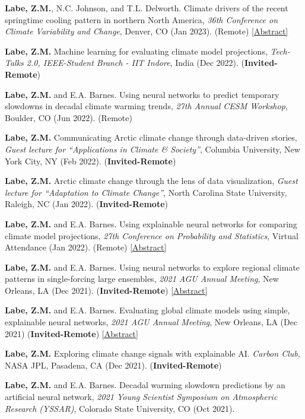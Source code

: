 \documentclass[margin,line,palatino,courier,10pt]{res}
\begin{document}
\begin{resume}
\begin{etaremune}[leftmargin=0in,topsep=0in,parsep=0in]
\item \textbf{Labe, Z.M.}, N.C. Johnson, and T.L. Delworth. Climate drivers of the recent springtime cooling pattern in northern North America, \textit{36th Conference on Climate Variability and Change}, Denver, CO (Jan 2023). (Remote) \href{https://ams.confex.com/ams/103ANNUAL/meetingapp.cgi/Paper/415409}{[Abstract]}
\item \textbf{Labe, Z.M.} Machine learning for evaluating climate model projections, \textit{Tech-Talks 2.0, IEEE-Student Branch - IIT Indore}, India (Dec 2022). (\textbf{Invited-Remote})
\item \textbf{Labe, Z.M.} and E.A. Barnes. Using neural networks to predict temporary slowdowns in decadal climate warming trends, \textit{27th Annual CESM Workshop}, Boulder, CO (Jun 2022). (Remote)
\item \textbf{Labe, Z.M.} Communicating Arctic climate change through data-driven stories, \textit{Guest lecture for ``Applications in Climate \& Society''}, Columbia University, New York City, NY (Feb 2022). (\textbf{Invited-Remote}) 
\item \textbf{Labe, Z.M.} Arctic climate change through the lens of data visualization, \textit{Guest lecture for ``Adaptation to Climate Change''}, North Carolina State University, Raleigh, NC (Jan 2022). (\textbf{Invited-Remote}) 
\item \textbf{Labe, Z.M.} and E.A. Barnes. Using explainable neural networks for comparing climate model projections, \textit{27th Conference on Probability and Statistics}, Virtual Attendance (Jan 2022). (Remote) \href{https://ams.confex.com/ams/102ANNUAL/meetingapp.cgi/Paper/392538}{[Abstract]}
\item \textbf{Labe, Z.M.} and E.A. Barnes. Using neural networks to explore regional climate patterns in single-forcing large ensembles, \textit{2021 AGU Annual Meeting}, New Orleans, LA (Dec 2021). (\textbf{Invited-Remote}) \href{https://agu.confex.com/agu/fm21/meetingapp.cgi/Paper/798039}{[Abstract]}
\item \textbf{Labe, Z.M.} and E.A. Barnes. Evaluating global climate models using simple, explainable neural networks, \textit{2021 AGU Annual Meeting}, New Orleans, LA (Dec 2021) (\textbf{Invited-Remote}) \href{https://agu.confex.com/agu/fm21/meetingapp.cgi/Paper/797879}{[Abstract]}
\item \textbf{Labe, Z.M.} Exploring climate change signals with explainable AI. \textit{Carbon Club}, NASA JPL, Pasadena, CA (Dec 2021). (\textbf{Invited-Remote})
\item \textbf{Labe, Z.M.} and E.A. Barnes. Decadal warming slowdown predictions by an artificial neural network, \textit{2021 Young Scientist Symposium on Atmospheric Research (YSSAR)}, Colorado State University, CO (Oct 2021).

\end{etaremune}
\end{resume}
\end{document}
